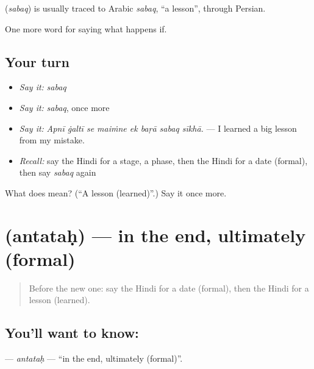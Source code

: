 \begin{cousinweb}
\textbf{} (\emph{sabaq}) is usually traced to Arabic \emph{sabaq}, \textquotedblleft{}a lesson\textquotedblright{}, through Persian.
\end{cousinweb}

\begin{grammarlens}[title={What you've built}]
One more word for saying what happens if.
\end{grammarlens}

\subsection*{Your turn}
\begin{itemize}
\raggedright
  \item \emph{Say it:} \emph{sabaq}
  \item \emph{Say it:} \emph{sabaq}, once more
  \item \emph{Say it:} \emph{Apnī ġaltī se maiṁne ek baṛā sabaq sīkhā.} — I learned a big lesson from my mistake.
  \item \emph{Recall:} say the Hindi for a stage, a phase, then the Hindi for a date (formal), then say \emph{sabaq} again
\end{itemize}

\begin{tcolorbox}[breakable,colback=teal!4,colframe=teal!35!black,title={Before you move on}]
What does  mean? (\textquotedblleft{}A lesson (learned)\textquotedblright{}.) Say it once more.
\end{tcolorbox}
\section[\texorpdfstring{\hi{अंततः} (antataḥ)}{अंततः (antataḥ)}]{ (antataḥ) — in the end, ultimately (formal)}

\label{lesson:HI-C554-antatah}



\begin{quote}
Before the new one: say the Hindi for a date (formal), then the Hindi for a lesson (learned).
\end{quote}

\subsection*{You'll want to know: }
\textbf{} — \emph{antataḥ} — \textquotedblleft{}in the end, ultimately (formal)\textquotedblright{}.

